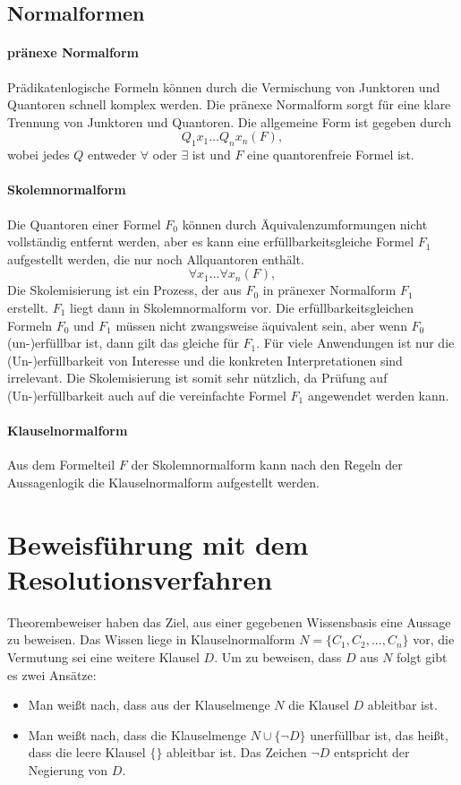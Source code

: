 \subsection{Normalformen}
\paragraph{pränexe Normalform} Prädikatenlogische Formeln können durch die Vermischung von Junktoren und Quantoren schnell komplex werden. Die pränexe Normalform sorgt für eine klare Trennung von Junktoren und Quantoren. Die allgemeine Form ist gegeben durch
$$Q_1x_1\ldots Q_nx_n(F),$$
wobei jedes $Q$ entweder $\forall$ oder $\exists$ ist und $F$ eine quantorenfreie Formel ist. \cite{Chang1973Symb}
\paragraph{Skolemnormalform} Die Quantoren einer Formel $F_0$ können durch Äquivalenzumformungen nicht vollständig entfernt werden, aber es kann eine erfüllbarkeitsgleiche Formel $F_1$ aufgestellt werden, die nur noch Allquantoren enthält.
$$\forall x_1\ldots \forall x_n(F),$$
 Die Skolemisierung ist ein Prozess, der aus $F_0$ in pränexer Normalform $F_1$ erstellt. $F_1$ liegt dann  in Skolemnormalform vor. Die erfüllbarkeitsgleichen Formeln $F_0$ und $F_1$ müssen nicht zwangsweise äquivalent sein, aber wenn $F_0$ (un-)erfüllbar ist, dann gilt das gleiche für $F_1$. Für viele Anwendungen ist nur die (Un-)erfüllbarkeit von Interesse und die konkreten Interpretationen sind irrelevant. Die Skolemisierung ist somit sehr nützlich, da Prüfung auf (Un-)erfüllbarkeit auch auf die vereinfachte Formel $F_1$ angewendet werden kann.	
\paragraph{Klauselnormalform}
Aus dem Formelteil $F$ der Skolemnormalform kann nach den Regeln der Aussagenlogik die Klauselnormalform aufgestellt werden. 

	\section{Beweisführung mit dem Resolutionsverfahren}

Theorembeweiser haben das Ziel, aus einer gegebenen Wissensbasis eine Aussage zu beweisen. Das Wissen liege in Klauselnormalform $N=\{C_1, C_2, ..., C_n \}$ vor, die Vermutung sei eine weitere Klausel $D$. Um zu beweisen, dass $D$ aus $N$ folgt gibt es zwei Ansätze: 
\begin{itemize}
\item Man weißt nach, dass aus der Klauselmenge $N$ die Klausel $D$ ableitbar ist. 
\item Man weißt nach, dass die Klauselmenge $N\cup\{\neg D\}$  unerfüllbar ist, das heißt, dass die leere Klausel $\{\}$ ableitbar ist. Das Zeichen $\neg D$ entspricht der Negierung von $D$.
\end{itemize}

